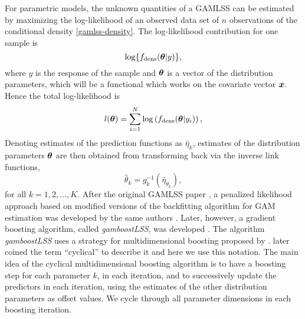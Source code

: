 For parametric models, the unknown quantities of a GAMLSS can be estimated by maximizing the log-likelihood of an observed
data set of $n$ observations of the conditional density \eqref{gamlss-density}.
The log-likelihood contribution for one sample is
\begin{equation*}
    \log\{f_{\text{dens}}(\boldsymbol{\theta}|y)\},
\end{equation*}
where $y$ is the response of the sample and $\boldsymbol{\theta}$ is a vector of the distribution parameters, which will be a functional which works on the covariate vector $\bm{x}$.
Hence the total log-likelihood is
\begin{equation*}
    l(\boldsymbol{\theta})=\sum_{i=1}^N\log\left(f_{\text{dens}}(\boldsymbol{\theta}|y_i)\right),
\end{equation*}
Denoting estimates of the prediction functions as $\hat{\eta}_k$, estimates of the distribution parameters $\boldsymbol{\theta}$ are then obtained from transforming back via the inverse link functions,
\begin{equation*}
    \hat{\theta}_k=g_k^{-1}(\hat{\eta}_{\theta_k}),
\end{equation*}
for all $k=1,2,\ldots,K$.
After the original GAMLSS paper \citep{gamlss}, a penalized likelihood approach based on modified versions of the backfitting algorithm for GAM estimation was developed by the same authors \citep{gamlssR}.
Later, however, a gradient boosting algorithm, called \textit{gamboostLSS}, was developed \citep{gamboostlss-paper}.
The algorithm \textit{gamboostLSS} uses a strategy for multidimensional boosting proposed by \citet{schmid}.
\citet{thomas2018} later coined the term ``cyclical'' to describe it and here we use this notation.
The main idea of the cyclical multidimensional boosting algorithm is to have a boosting step for each parameter $k$, in each iteration, and to successively update the predictors in each iteration, using the estimates of the other distribution parameters as offset values.
We cycle through all parameter dimensions in each boosting iteration.


